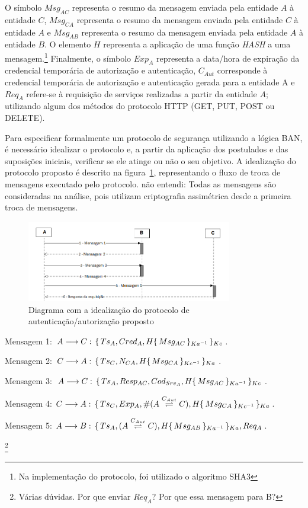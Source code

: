 O símbolo ${Msg_{AC}}$ representa o resumo da mensagem enviada pela entidade ${A}$ \`{a} entidade ${C}$,  ${Msg_{CA}}$ representa o resumo da mensagem enviada pela entidade ${C}$ 
\`{a} entidade ${A}$ e ${Msg_{AB}}$ representa o resumo da mensagem enviada pela entidade ${A}$ \`{a} entidade ${B}$. O elemento ${H}$ representa a aplica\c c\~{a}o de 
uma fun\c c\~{a}o \emph{HASH} a uma mensagem.\footnote{Na implementa\c c\~{a}o do protocolo, foi utilizado o algoritmo SHA3}
Finalmente, o símbolo ${Exp_A}$ representa a data/hora  de expiração da credencial temporária de autorização e autenticação, ${C_{Aut}}$ corresponde à credencial temporária de autorização e autenticação gerada para a entidade A e ${Req_A}$ refere-se à requisição de serviços realizadas a partir da entidade $A$;
utilizando algum dos m\'{e}todos do protocolo HTTP (GET, PUT, POST ou DELETE).

Para especificar formalmente um protocolo de segurança utilizando a lógica BAN, é necessário idealizar o protocolo e, a partir da aplicação dos postulados e das suposições iniciais, verificar se ele atinge ou não o seu objetivo. A idealização do protocolo proposto \'{e} descrito na figura~\ref{fig:protocoidealizado}, representando o fluxo de troca de mensagens executado pelo protocolo. {\color{blue}n\~{a}o entendi: Todas as mensagens são consideradas na análise, pois utilizam criptografia assimétrica desde a primeira troca de mensagens}.

\begin{figure}[!htb]
    \centering
    \includegraphics[width=0.8\textwidth]{fluxo_autenticacao_BAN.png}
    \caption{Diagrama com a idealização do protocolo de autenticação/autorização proposto}
    \label{fig:protocoidealizado}
\end{figure}

\begin{enumerate}
  \item Mensagem 1: ${A}\longrightarrow{C}:\,{\{\,{Ts_A,Cred_A,H{\{\,{Msg_{AC}}\,\}_{Ka ^{-1}}}}\,\}_{Kc}}$.
  \item Mensagem 2: ${C}\longrightarrow{A}:\,{\{\,{Ts_C,{N_{CA}},H{\{\,{Msg_{CA}}\,\}_{Kc ^{-1}}}}\,\}_{Ka}}$.
  \item Mensagem 3: ${A}\longrightarrow{C}:\,{\{\,{Ts_A,{Resp_{AC}},Cod_{Srv_A},H{\{\,{Msg_{AC}}\,\}_{Ka ^{-1}}}}\,\}_{Kc}}$.
  \item Mensagem 4: ${C}\longrightarrow{A}:\,{\{\,{Ts_C,Exp_A,\#({A}\stackrel{{C_{Aut}}}{\rightleftharpoons}{C}),H{\{\,{Msg_{CA}}\,\}_{Kc ^{-1}}}}\,\}_{Ka}}$.
  {\color{blue}\item Mensagem 5: ${A}\longrightarrow{B}:\,{\{\,{Ts_A,({A}\stackrel{{C_{Aut}}}{\rightleftharpoons}{C}),H{\{\,{Msg_{AB}}\,\}_{Ka ^{-1}}}}\,\}_{Ka}},{Req_A}$.}\footnote{V\'{a}rias d\'{u}vidas. Por que enviar 
$Req_A$? Por que essa mensagem para B?} 
\end{enumerate}

